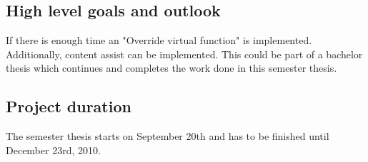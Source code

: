 \documentclass[a4paper,12pt]{scrreprt}
\begin{document}
\subsection*{High level goals and outlook}

If there is enough time an "Override virtual function" is implemented.
Additionally, content assist can be implemented. This could be part of a
bachelor thesis which continues and completes the work done in this semester
thesis.

\subsection*{Project duration}
The semester thesis starts on September 20th and has to be finished until
December 23rd, 2010.
\end{document}
